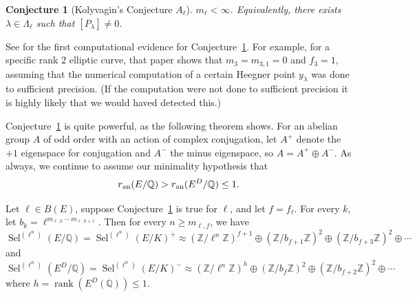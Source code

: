 \documentclass{oupau}
\DeclareMathOperator{\rank}{rank}
\DeclareMathOperator{\Sel}{Sel}
\newcommand{\an}{{\rm an}}
\newcommand{\QQ}{\mathbb{Q}}
\newcommand{\ZZ}{\mathbb{Z}}
\newcommand{\ncisom}{\approx}   %
\newtheorem{conjecture}[theorem]{Conjecture}
\begin{document}
\begin{conjecture}[Kolyvagin's Conjecture $A_\ell$]\label{conj:A}
$m_{\ell} < \infty$.  Equivalently, there exists $\lambda\in \Lambda_{\ell}$ such
that $[P_{\lambda}] \neq 0$.
\end{conjecture}
See \cite{jetchev-lauter-stein} for the first computational evidence
for Conjecture~\ref{conj:A}.  For example, for a specific rank $2$
elliptic curve, that paper shows that $m_3 = m_{3,1} = 0$ and $f_3 =
1$, assuming that the numerical computation of a certain Heegner point
$y_{\lambda}$ was done to sufficient precision. (If the computation
were not done to sufficient precision it is highly likely that we
would haved detected this.)

Conjecture~\ref{conj:A} is quite powerful, as the following theorem
shows.  For an abelian group $A$ of odd order with an action of
complex conjugation, let $A^+$ denote the $+1$ eigenspace for
conjugation and $A^-$ the minus eigenspace, so $A = A^+ \oplus A^-$.
As always, we continue to assume our minimality hypothesis that
$$
r_{\an}(E/\QQ) > r_{\an}(E^D/\QQ) \leq 1.
$$
\begin{theorem}[Kolyvagin]\label{thm:kolythm1}
Let $\ell\in B(E)$, suppose Conjecture~\ref{conj:A} is true for $\ell$,
and let $f = f_{\ell}$. 
For every $k$, let $b_k = \ell^{m_{\ell,k}-m_{\ell,k+1}}$.
Then for every 
$n\geq m_{\ell,f}$, we have
$$
  \Sel^{(\ell^n)}(E/\QQ) = \Sel^{(\ell^n)}(E/K)^+ \ncisom (\ZZ/\ell^n\ZZ)^{f+1} 
     \oplus (\ZZ/b_{f+1}\ZZ)^{2}
     \oplus (\ZZ/b_{f+3}\ZZ)^{2}
     \oplus \cdots
$$
and
$$
  \Sel^{(\ell^n)}(E^D/\QQ) =   \Sel^{(\ell^n)}(E/K)^- \ncisom 
(\ZZ/\ell^n\ZZ)^{h} 
     \oplus (\ZZ/b_f \ZZ)^{2}
     \oplus (\ZZ/b_{f+2} \ZZ)^{2}
     \oplus \cdots
$$
where $h=\rank(E^D(\QQ)) \leq 1$.
\end{theorem}
\end{document}
